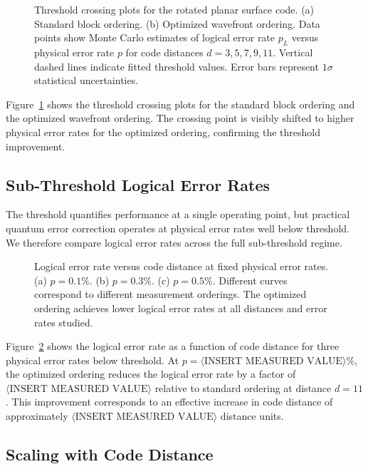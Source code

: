 \documentclass[
    reprint,
    aps,
    prx,
    superscriptaddress,
    longbibliography
]{revtex4-2}
\begin{document}
\begin{figure}[t]
    \caption{Threshold crossing plots for the rotated planar surface code. (a) Standard block ordering. (b) Optimized wavefront ordering. Data points show Monte Carlo estimates of logical error rate $p_L$ versus physical error rate $p$ for code distances $d = 3, 5, 7, 9, 11$. Vertical dashed lines indicate fitted threshold values. Error bars represent $1\sigma$ statistical uncertainties.}
    \label{fig:threshold_crossings}
\end{figure}

Figure~\ref{fig:threshold_crossings} shows the threshold crossing plots for the standard block ordering and the optimized wavefront ordering. The crossing point is visibly shifted to higher physical error rates for the optimized ordering, confirming the threshold improvement.

\subsection{Sub-Threshold Logical Error Rates}
\label{subsec:subthreshold}

The threshold quantifies performance at a single operating point, but practical quantum error correction operates at physical error rates well below threshold. We therefore compare logical error rates across the full sub-threshold regime.

\begin{figure}[t]
    \caption{Logical error rate versus code distance at fixed physical error rates. (a) $p = 0.1\%$. (b) $p = 0.3\%$. (c) $p = 0.5\%$. Different curves correspond to different measurement orderings. The optimized ordering achieves lower logical error rates at all distances and error rates studied.}
    \label{fig:subthreshold}
\end{figure}

Figure~\ref{fig:subthreshold} shows the logical error rate as a function of code distance for three physical error rates below threshold. At $p = \langle\text{INSERT MEASURED VALUE}\rangle$\%, the optimized ordering reduces the logical error rate by a factor of $\langle\text{INSERT MEASURED VALUE}\rangle$ relative to standard ordering at distance $d = 11$. This improvement corresponds to an effective increase in code distance of approximately $\langle\text{INSERT MEASURED VALUE}\rangle$ distance units.

\subsection{Scaling with Code Distance}
\label{subsec:scaling}
\end{document}
